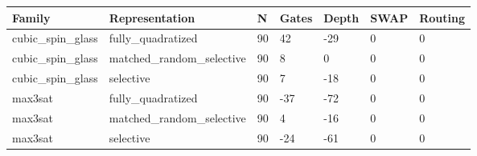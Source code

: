 \begin{tabular}{lllllll}
\hline
Family & Representation & N & Gates & Depth & SWAP & Routing \\
\hline
cubic\_spin\_glass & fully\_quadratized & 90 & 42 & -29 & 0 & 0 \\
cubic\_spin\_glass & matched\_random\_selective & 90 & 8 & 0 & 0 & 0 \\
cubic\_spin\_glass & selective & 90 & 7 & -18 & 0 & 0 \\
max3sat & fully\_quadratized & 90 & -37 & -72 & 0 & 0 \\
max3sat & matched\_random\_selective & 90 & 4 & -16 & 0 & 0 \\
max3sat & selective & 90 & -24 & -61 & 0 & 0 \\
\hline
\end{tabular}
